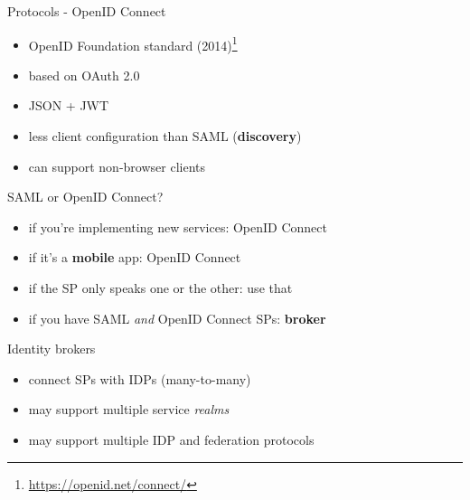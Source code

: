 \documentclass[ignorenonframetext,aspectratio=169]{beamer}
\providecommand{\tightlist}{%
  \setlength{\itemsep}{0pt}\setlength{\parskip}{0pt}}
\begin{document}
\begin{frame}{Protocols - OpenID Connect}
\begin{itemize}
\tightlist
\item OpenID Foundation standard (2014)\footnote{
        \url{https://openid.net/connect/}}
\item based on OAuth 2.0
\item JSON + JWT
\item less client configuration than SAML ({\bf discovery})
\item can support non-browser clients
\end{itemize}
\end{frame}

\begin{frame}{SAML or OpenID Connect?}
\begin{itemize}
\tightlist
\item if you're implementing new services: OpenID Connect
\item if it's a {\bf mobile} app: OpenID Connect
\item if the SP only speaks one or the other: use that
\item if you have SAML {\em and} OpenID Connect SPs: {\bf broker}
\end{itemize}
\end{frame}

\begin{frame}{Identity brokers}

\begin{itemize}
\tightlist
\item
  connect SPs with IDPs (many-to-many)
\item
  may support multiple service \emph{realms}
\item
  may support multiple IDP and federation protocols
\end{itemize}

\end{frame}

\begin{frame}[plain]
\centering
{}
\end{frame}
\end{document}
